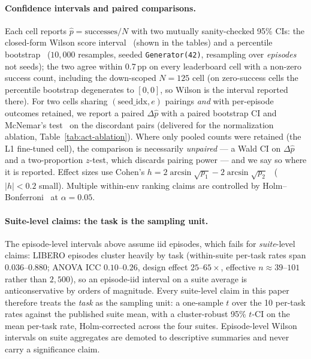\documentclass[10pt]{article}
\begin{document}
\paragraph{Confidence intervals and paired comparisons.}
Each cell reports $\hat{p}{=}\text{successes}/N$ with two mutually
sanity-checked 95\% CIs: the closed-form Wilson score
interval~\cite{wilson1927probable,agresti1998approximate} (shown in the
tables) and a percentile bootstrap~\cite{efron1979bootstrap,efron1993introduction}
($10{,}000$ resamples, seeded \texttt{Generator(42)}, resampling over
\emph{episodes} not seeds); the two agree within 0.7\,pp on every
leaderboard cell with a non-zero success count, including the down-scoped
$N{=}125$ cell (on zero-success cells the percentile bootstrap degenerates
to $[0,0]$, so Wilson is the interval reported there). For
two cells sharing $(\text{seed\_idx}, e)$ pairings \emph{and} with
per-episode outcomes retained, we report a paired
$\Delta\hat{p}$ with a paired bootstrap CI and
McNemar's test~\cite{mcnemar1947note} on the discordant pairs
(delivered for the normalization ablation,
Table~\ref{tab:act-ablation}). Where only pooled counts were retained
(the L1 fine-tuned cell), the comparison is necessarily \emph{unpaired}
--- a Wald CI on $\Delta\hat{p}$ and a two-proportion $z$-test, which
discards pairing power --- and we say so where it is reported. Effect
sizes use Cohen's
$h{=}2\arcsin\!\sqrt{p_1}-2\arcsin\!\sqrt{p_2}$~\cite{cohen1988statistical}
($|h|{<}0.2$ small). Multiple within-env ranking claims are controlled by
Holm--Bonferroni~\cite{holm1979simple} at $\alpha{=}0.05$.

\paragraph{Suite-level claims: the task is the sampling unit.}
The episode-level intervals above assume iid episodes, which fails for
\emph{suite}-level claims: LIBERO episodes cluster heavily by task
(within-suite per-task rates span $0.036$--$0.880$; ANOVA ICC
$0.10$--$0.26$, design effect $25$--$65\times$, effective
$n\approx39$--$101$ rather than $2{,}500$), so an episode-iid interval on
a suite average is anticonservative by orders of magnitude. Every
suite-level claim in this paper therefore treats the \emph{task} as the
sampling unit: a one-sample $t$ over the 10 per-task rates against the
published suite mean, with a cluster-robust 95\% $t$-CI on the mean
per-task rate, Holm-corrected across the four suites. Episode-level Wilson
intervals on suite aggregates are demoted to descriptive summaries and
never carry a significance claim.
\end{document}

